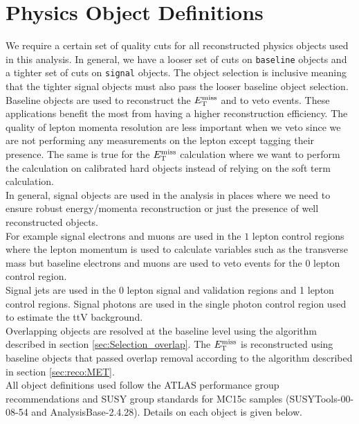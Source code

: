 \chapter{Physics Object Definitions}
\label{chap:objects}

\indent We require a certain set of quality cuts for all reconstructed physics objects used in this analysis.  In general, we have a looser set of cuts on {\tt baseline} objects and a tighter set of cuts on {\tt signal} objects.  The object selection is inclusive meaning that the tighter signal objects must also pass the looser baseline object selection.  \\

\indent Baseline objects are used to reconstruct the $E_{\mathrm{T}}^{\mathrm{miss}}$ and to veto events.  These applications benefit the most from having a higher reconstruction efficiency.  The quality of lepton momenta resolution are less important when we veto since we are not performing any measurements on the lepton except tagging their presence.  The same is true for the $E_{\mathrm{T}}^{\mathrm{miss}}$ calculation where we want to perform the calculation on calibrated hard objects instead of relying on the soft term calculation.  \\

\indent In general, signal objects are used in the analysis in places where we need to ensure robust energy/momenta reconstruction or just the presence of well reconstructed objects.  \\

\indent For example signal electrons and muons are used in the $1$ lepton control regions where the lepton momentum is used to calculate variables such as the transverse mass but baseline electrons and muons are used to veto events for the $0$ lepton control region. \\

\indent Signal jets are used in the 0 lepton signal and validation regions and 1 lepton control regions.  Signal photons are used in the single photon control region used to estimate the ttV background. \\

\indent Overlapping objects are resolved at the baseline level using the algorithm described in section \ref{sec:Selection_overlap}.  The $E_{\mathrm{T}}^{\mathrm{miss}}$ is reconstructed using baseline objects that passed overlap removal according to the algorithm described in section \ref{sec:reco:MET}. \\

\indent All object definitions used follow the ATLAS performance group recommendations and SUSY group standards for MC15c samples ({\sc SUSYTools-00-08-54} and {\sc AnalysisBase-2.4.28}).  Details on each object is given below. \\

